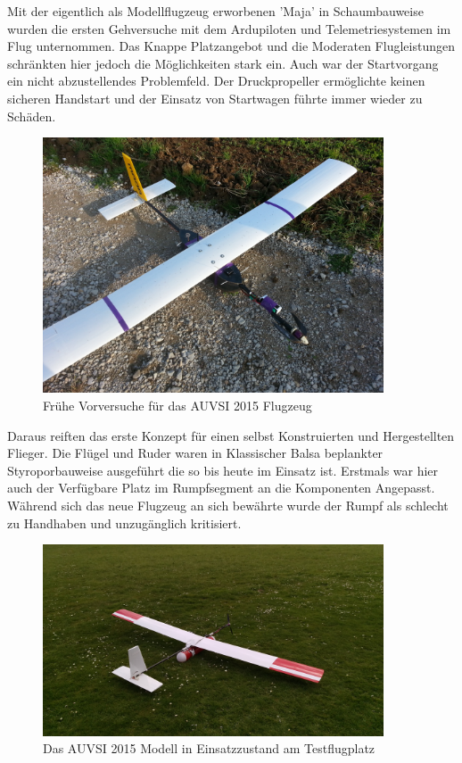 Mit der eigentlich als Modellflugzeug erworbenen 'Maja' in Schaumbauweise wurden die ersten Gehversuche mit dem Ardupiloten und Telemetriesystemen im Flug unternommen. Das Knappe Platzangebot und die Moderaten Flugleistungen schränkten hier jedoch die Möglichkeiten stark ein. Auch war der Startvorgang ein nicht abzustellendes Problemfeld. Der Druckpropeller ermöglichte keinen sicheren Handstart und der Einsatz von Startwagen führte immer wieder zu Schäden.

\begin{figure}[H]
\centering
\includegraphics[width=0.9\textwidth]{bilder/Fotos/AUVSI-MAYA-Hybrid.jpg} 
\caption{Frühe Vorversuche für das AUVSI 2015 Flugzeug} 
\label{Frühe Vorversuche für das AUVSI 2015 Flugzeug}
\end{figure}

Daraus reiften das erste Konzept für einen selbst Konstruierten und Hergestellten Flieger. Die Flügel und Ruder waren in Klassischer Balsa beplankter Styroporbauweise ausgeführt die so bis heute im Einsatz ist. Erstmals war hier auch der Verfügbare Platz im Rumpfsegment an die Komponenten Angepasst. Während sich das neue Flugzeug an sich bewährte wurde der Rumpf als schlecht zu Handhaben und unzugänglich kritisiert.

\begin{figure}[H]
\centering
\includegraphics[width=0.9\textwidth]{bilder/Fotos/AUVSI_2015.jpg} 
\caption{Das AUVSI 2015 Modell in Einsatzzustand am Testflugplatz} 
\label{Das AUVSI 2015 Modell in Einsatzzustand am Testflugplatz}
\end{figure}

